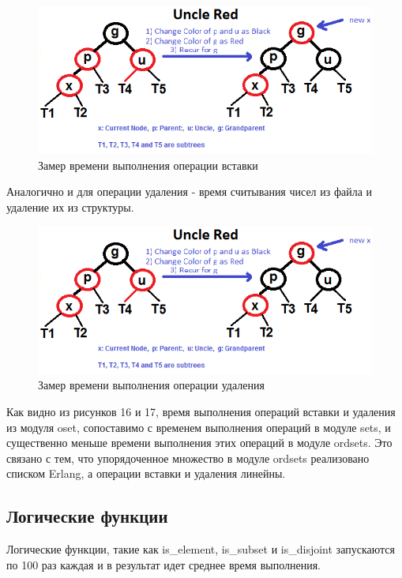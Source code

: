 		\begin{figure}[H]
				\centering
				\includegraphics[width=\textwidth]{img/tan-aus.png}
				\caption{Замер времени выполнения операции вставки}
		\end{figure}
		
		Аналогично и для операции удаления - время считывания чисел из файла и удаление их из структуры. 
		
		\begin{figure}[H]
				\centering
				\includegraphics[width=\textwidth]{img/tan-aus.png}
				\caption{Замер времени выполнения операции удаления}
		\end{figure}
		
		Как видно из рисунков 16 и 17, время выполнения операций вставки и удаления из модуля oset, сопоставимо 
		с временем выполнения операций в модуле sets, и существенно меньше времени выполнения этих операций
		в модуле ordsets. Это связано с тем, что упорядоченное множество в модуле ordsets реализовано 
		списком Erlang, а операции вставки и удаления линейны. 	
		
	\subsection{Логические функции}
		Логические функции, такие как is\_element, is\_subset и is\_disjoint запускаются по 100 раз
		каждая и в результат идет среднее время выполнения.
		
